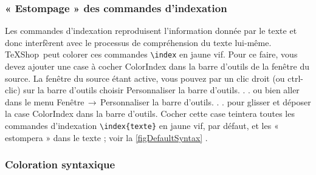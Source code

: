 \documentclass[11pt,french]{article}
\newcommand{\TS}{\textsf{\TeX Shop}}
\newcommand{\cmd}[1]{\textsf{#1}}
\newcommand{\mnu}[1]{\textsf{#1}}
\newcommand{\To}{\,\(\to\)\,}
\begin{document}
\subsubsection{« Estompage » des commandes d'indexation}\label{secIndex}


Les commandes d'indexation reproduisent l'information donnée par le texte et donc interfèrent avec le processus de compréhension du texte lui-même. \TS\ peut colorer ces commandes \verb+\index+ en jaune vif. Pour ce faire, vous devez ajouter une case à cocher \cmd{ColorIndex} dans la barre d'outils de la fenêtre du source. La fenêtre du source étant active, vous pouvez par un clic droit (ou \cmd{ctrl-clic}) sur la barre d'outils choisir \mnu{Personnaliser la barre d'outils. . .} ou bien aller dans le menu \mnu{Fenêtre}\To\mnu{Personnaliser la barre d'outils. . .} pour glisser et déposer la case \cmd{ColorIndex} dans la barre d'outils. Cocher cette case teintera toutes les commandes d'indexation \verb+\index{texte}+ en jaune vif, par défaut, et les « estompera » dans le texte ; voir la \cref{figDefaultSyntax} .%

\subsubsection{Coloration syntaxique}
\end{document}
